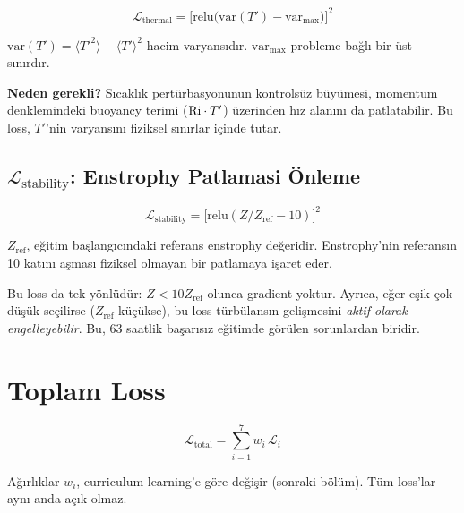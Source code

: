 \begin{equation}
    \boxed{
        \mathcal{L}_{\text{thermal}} = \big[\text{relu}\big(\text{var}(T') - \text{var}_{\max}\big)\big]^2
    }
    \label{eq:loss_thermal}
\end{equation}

$\text{var}(T') = \langle T'^2 \rangle - \langle T' \rangle^2$ hacim varyansıdır. $\text{var}_{\max}$ probleme bağlı bir üst sınırdır.

\textbf{Neden gerekli?} Sıcaklık pertürbasyonunun kontrolsüz büyümesi, momentum denklemindeki buoyancy terimi ($\mathrm{Ri} \cdot T'$) üzerinden hız alanını da patlatabilir. Bu loss, $T'$'nin varyansını fiziksel sınırlar içinde tutar.


\subsection{$\mathcal{L}_{\text{stability}}$: Enstrophy Patlamasi Önleme}
\label{sec:loss_stability}

\begin{equation}
    \boxed{
        \mathcal{L}_{\text{stability}} = \big[\text{relu}(Z / Z_{\text{ref}} - 10)\big]^2
    }
    \label{eq:loss_stability}
\end{equation}

$Z_{\text{ref}}$, eğitim başlangıcındaki referans enstrophy değeridir. Enstrophy'nin referansın 10 katını aşması fiziksel olmayan bir patlamaya işaret eder.

\begin{remark}
Bu loss da tek yönlüdür: $Z < 10 Z_{\text{ref}}$ olunca gradient yoktur. Ayrıca, eğer eşik çok düşük seçilirse ($Z_{\text{ref}}$ küçükse), bu loss türbülansın gelişmesini \textit{aktif olarak engelleyebilir}. Bu, 63 saatlik başarısız eğitimde görülen sorunlardan biridir.
\end{remark}


\section{Toplam Loss}
\label{sec:total_loss}

\begin{equation}
    \mathcal{L}_{\text{total}} = \sum_{i=1}^{7} w_i \, \mathcal{L}_i
    \label{eq:total_loss}
\end{equation}

Ağırlıklar $w_i$, curriculum learning'e göre değişir (sonraki bölüm). Tüm loss'lar aynı anda açık olmaz.


